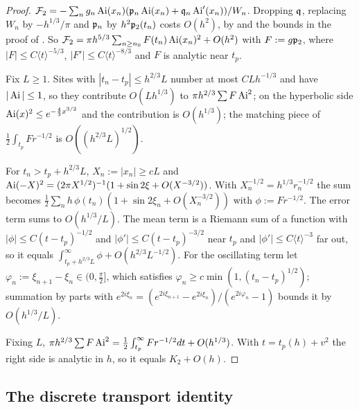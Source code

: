 \begin{proof}
 $\mathcal F_2=-\sum_ng_n\operatorname{Ai}(x_n)(\mathfrak{p}_n\operatorname{Ai}(x_n)+\mathfrak{q}_n\operatorname{Ai}'(x_n))/W_n$. Dropping $\mathfrak{q}$, replacing
$W_n$ by $-h^{1/3}/\pi$ and $\mathfrak{p}_n$ by $h^2\mathfrak{p}_2(t_n)$ costs $O(h^2)$, by  and the
bounds in the proof of . So
$\mathcal F_2=\pi h^{5/3}\sum_{n\ge n_0}F(t_n)\operatorname{Ai}(x_n)^2+O(h^2)$ with $F:=g\mathfrak{p}_2$, where
$|F|\le C\langle t\rangle^{-5/3}$, $|F'|\le C\langle t\rangle^{-8/3}$ and $F$ is analytic near $t_p$.

 Fix $L\ge1$. Sites with $|t_n-t_p|\le h^{2/3}L$ number at most
$CLh^{-1/3}$ and have $|\operatorname{Ai}|\le1$, so they contribute $O(Lh^{1/3})$ to
$\pi h^{2/3}\sum F\operatorname{Ai}^2$; on the hyperbolic side $\operatorname{Ai}(x)^2\le e^{-\frac43x^{3/2}}$ and the
contribution is $O(h^{1/3})$; the matching piece of $\frac12\int_{t_p}F r^{-1/2}$ is
$O((h^{2/3}L)^{1/2})$.

 For $t_n>t_p+h^{2/3}L$, $X_n:=|x_n|\ge cL$ and
$\operatorname{Ai}(-X)^2=(2\pi X^{1/2})^{-1}(1+\sin2\xi+O(X^{-3/2}))$. With $X_n^{-1/2}=h^{1/3}r_n^{-1/2}$ the
sum becomes $\frac12\sum_nh\,\phi(t_n)(1+\sin2\xi_n+O(X_n^{-3/2}))$ with $\phi:=Fr^{-1/2}$. The
error term sums to $O(h^{1/3}/L)$. The mean term is a Riemann sum of a function with
$|\phi|\le C(t-t_p)^{-1/2}$ and $|\phi'|\le C(t-t_p)^{-3/2}$ near $t_p$ and $|\phi'|\le C\langle t\rangle^{-3}$
far out, so it equals $\int_{t_p+h^{2/3}L}^\infty\phi+O(h^{2/3}L^{-1/2})$. For the oscillating
term let $\varphi_n:=\xi_{n+1}-\xi_n\in(0,\frac\pi2]$, which satisfies
$\varphi_n\ge c\min(1,(t_n-t_p)^{1/2})$; summation by parts with
$e^{2i\xi_n}=(e^{2i\xi_{n+1}}-e^{2i\xi_n})/(e^{2i\varphi_n}-1)$ bounds it by $O(h^{1/3}/L)$.

 Fixing $L$, $\pi h^{2/3}\sum F\operatorname{Ai}^2=\frac12\int_{t_p}^\infty Fr^{-1/2}dt+O(h^{1/3})$.
With $t=t_p(h)+v^2$ the right side is analytic in $h$, so it equals $K_2+O(h)$.
\end{proof}


\subsection{The discrete transport identity}\label{app:transport}

